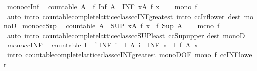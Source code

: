 \begin{isabellebody}
\isanewline
\isanewline
{}\isamarkupfalse%
\ mono{\isacharunderscore}ccInf{\isacharcolon}\isanewline
\ \ {\isachardoublequoteopen}countable\ A\ {\isasymLongrightarrow}\ f\ {\isacharparenleft}Inf\ A{\isacharparenright}\ {\isasymle}\ {\isacharparenleft}INF\ x{\isasymin}A{\isachardot}\ f\ x{\isacharparenright}{\isachardoublequoteclose}\isanewline
%
\isadelimproof
\ \ %
\endisadelimproof
%
\isatagproof
{}\isamarkupfalse%
\ {\isacartoucheopen}mono\ f{\isacartoucheclose}\isanewline
\ \ \isamarkupfalse%
\ {\isacharparenleft}auto\ intro{\isacharbang}{\isacharcolon}\ countable{\isacharunderscore}complete{\isacharunderscore}lattice{\isacharunderscore}class{\isachardot}ccINF{\isacharunderscore}greatest\ intro{\isacharcolon}\ ccInf{\isacharunderscore}lower\ dest{\isacharcolon}\ monoD{\isacharparenright}%
\endisatagproof
{\isafoldproof}%
%
\isadelimproof
\isanewline
%
\endisadelimproof
\isanewline
{}\isamarkupfalse%
\ mono{\isacharunderscore}ccSup{\isacharcolon}\isanewline
\ \ {\isachardoublequoteopen}countable\ A\ {\isasymLongrightarrow}\ {\isacharparenleft}SUP\ x{\isasymin}A{\isachardot}\ f\ x{\isacharparenright}\ {\isasymle}\ f\ {\isacharparenleft}Sup\ A{\isacharparenright}{\isachardoublequoteclose}\isanewline
%
\isadelimproof
\ \ %
\endisadelimproof
%
\isatagproof
{}\isamarkupfalse%
\ {\isacartoucheopen}mono\ f{\isacartoucheclose}\ \isamarkupfalse%
\ {\isacharparenleft}auto\ intro{\isacharcolon}\ countable{\isacharunderscore}complete{\isacharunderscore}lattice{\isacharunderscore}class{\isachardot}ccSUP{\isacharunderscore}least\ ccSup{\isacharunderscore}upper\ dest{\isacharcolon}\ monoD{\isacharparenright}%
\endisatagproof
{\isafoldproof}%
%
\isadelimproof
\isanewline
%
\endisadelimproof
\isanewline
{}\isamarkupfalse%
\ mono{\isacharunderscore}ccINF{\isacharcolon}\isanewline
\ \ {\isachardoublequoteopen}countable\ I\ {\isasymLongrightarrow}\ f\ {\isacharparenleft}INF\ i\ {\isasymin}\ I{\isachardot}\ A\ i{\isacharparenright}\ {\isasymle}\ {\isacharparenleft}INF\ x\ {\isasymin}\ I{\isachardot}\ f\ {\isacharparenleft}A\ x{\isacharparenright}{\isacharparenright}{\isachardoublequoteclose}\isanewline
%
\isadelimproof
\ \ %
\endisadelimproof
%
\isatagproof
{}\isamarkupfalse%
\ {\isacharparenleft}intro\ countable{\isacharunderscore}complete{\isacharunderscore}lattice{\isacharunderscore}class{\isachardot}ccINF{\isacharunderscore}greatest\ monoD{\isacharbrackleft}OF\ {\isacartoucheopen}mono\ f{\isacartoucheclose}{\isacharbrackright}\ ccINF{\isacharunderscore}lower{\isacharparenright}%

\end{isabellebody}
